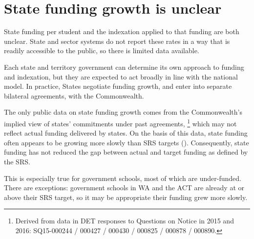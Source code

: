\documentclass{grattan}
\begin{document}
\section{State funding growth is unclear}\label{sec:state-funding-growth-is-unclear}

State funding per student and the indexation applied to that funding are both unclear. State and sector systems do not report these rates in a way that is readily accessible to the public, so there is limited data available.

Each state and territory government can determine its own approach to funding and indexation, but they are expected to act broadly in line with the national model. In practice, States negotiate funding growth, and enter into separate bilateral agreements, with the Commonwealth.

The only public data on state funding growth comes from the Commonwealth's implied view of states' commitments under past agreements,%
\footnote{Derived from data in DET responses to Questions on Notice in 2015 and 2016: SQ15-000244 / 000427 / 000430 / 000825 / 000878 / 000890.}
which may not reflect actual funding delivered by states.
On the basis of this data, state funding often appears to be growing more slowly than SRS targets ().
Consequently, state funding has not reduced the gap between actual and target funding as defined by the SRS\@.

This is especially true for government schools, most of which are under-funded.
There are exceptions:
government schools in WA and the ACT are already at or above their SRS target, so it may be appropriate their funding grew more slowly.
\end{document}
